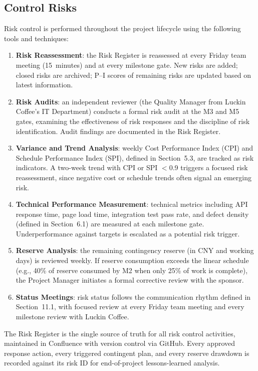 \documentclass[12pt,a4paper]{article}
\begin{document}
\subsection{Control Risks}

Risk control is performed throughout the project lifecycle using the following tools and techniques:

\begin{enumerate}[leftmargin=*]
    \item \textbf{Risk Reassessment}: the Risk Register is reassessed at every Friday team meeting (15~minutes) and at every milestone gate. New risks are added; closed risks are archived; P--I scores of remaining risks are updated based on latest information.
    \item \textbf{Risk Audits}: an independent reviewer (the Quality Manager from Luckin Coffee's IT Department) conducts a formal risk audit at the M3 and M5 gates, examining the effectiveness of risk responses and the discipline of risk identification. Audit findings are documented in the Risk Register.
    \item \textbf{Variance and Trend Analysis}: weekly Cost Performance Index (CPI) and Schedule Performance Index (SPI), defined in Section~5.3, are tracked as risk indicators. A two-week trend with CPI or SPI $<$0.9 triggers a focused risk reassessment, since negative cost or schedule trends often signal an emerging risk.
    \item \textbf{Technical Performance Measurement}: technical metrics including API response time, page load time, integration test pass rate, and defect density (defined in Section~6.1) are measured at each milestone gate. Underperformance against targets is escalated as a potential risk trigger.
    \item \textbf{Reserve Analysis}: the remaining contingency reserve (in CNY and working days) is reviewed weekly. If reserve consumption exceeds the linear schedule (e.g., 40\% of reserve consumed by M2 when only 25\% of work is complete), the Project Manager initiates a formal corrective review with the sponsor.
    \item \textbf{Status Meetings}: risk status follows the communication rhythm defined in Section~11.1, with focused review at every Friday team meeting and every milestone review with Luckin Coffee.
\end{enumerate}

The Risk Register is the single source of truth for all risk control activities, maintained in Confluence with version control via GitHub. Every approved response action, every triggered contingent plan, and every reserve drawdown is recorded against its risk ID for end-of-project lessons-learned analysis.
\clearpage
\end{document}
